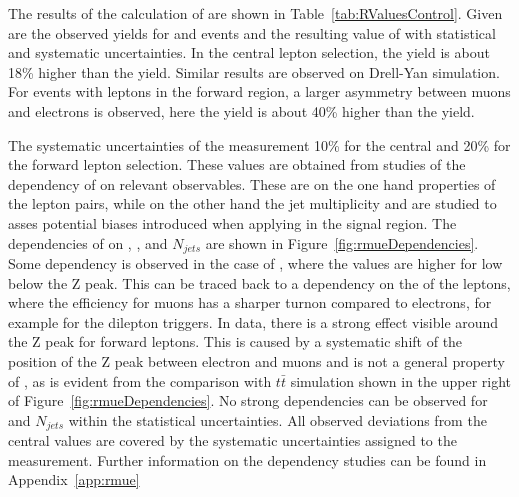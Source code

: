 The results of the calculation of \rmue are shown in Table~\ref{tab:RValuesControl}. Given are the observed yields for \MM and \EE events and the resulting value of \rmue with statistical and systematic uncertainties. In the central lepton selection, the \MM yield is about 18\% higher than the \EE yield. Similar results are observed on Drell-Yan simulation. For events with leptons in the forward region, a larger asymmetry between muons and electrons is observed, here the \MM yield is about 40\% higher than the \EE yield. 

The systematic uncertainties of the measurement 10\% for the central and 20\% for the forward lepton selection. These values are obtained from studies of the dependency of \rmue on relevant observables. These are on the one hand properties of the lepton pairs, while on the other hand the jet multiplicity and \MET are studied to asses potential biases introduced when applying \Rsfof in the signal region. The dependencies of \rmue on \mll, \MET, and $N_{jets}$ are shown in Figure~\ref{fig:rmueDependencies}. Some dependency is observed in the case of \mll, where the values are higher for low \mll below the Z peak. This can be traced back to a dependency on the \pt of the leptons, where the efficiency for muons has a sharper turnon compared to electrons, for example for the dilepton triggers. In data, there is a strong effect visible around the Z peak for forward leptons. This is caused by a systematic shift of the position of the Z peak between electron and muons and is not a general property of \rmue, as is evident from the comparison with $t\bar{t}$ simulation shown in the upper right of Figure~\ref{fig:rmueDependencies}. No strong dependencies can be observed for \MET and $N_{jets}$ within the statistical uncertainties. All observed deviations from the central values are covered by the systematic uncertainties assigned to the measurement. Further information on the dependency studies can be found in Appendix~\ref{app:rmue}
